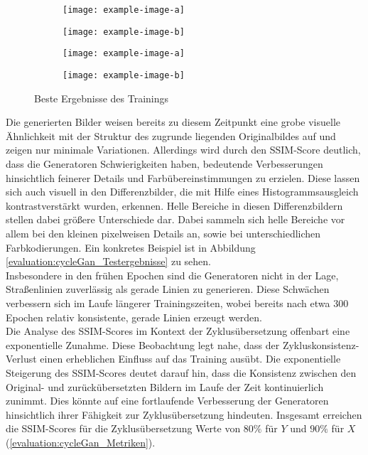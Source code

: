 \begin{figure}
  \medskip

  \begin{subfigure}[t]{.2\textwidth}
    \centering
    \texttt{[image: example-image-a]}
  \end{subfigure}
  \begin{subfigure}[t]{.2\textwidth}
    \centering
    \texttt{[image: example-image-b]}
  \end{subfigure}
  \hfill
  \begin{subfigure}[t]{.2\textwidth}
    \centering
    \texttt{[image: example-image-a]}
  \end{subfigure}
  \begin{subfigure}[t]{.2\textwidth}
    \centering
    \texttt{[image: example-image-b]}
  \end{subfigure}
  \caption{Beste Ergebnisse des Trainings}

\end{figure}


Die generierten Bilder weisen bereits zu diesem Zeitpunkt eine grobe visuelle Ähnlichkeit mit der Struktur des zugrunde liegenden Originalbildes auf und zeigen nur minimale Variationen. Allerdings wird durch den SSIM-Score deutlich, dass die Generatoren Schwierigkeiten haben, bedeutende Verbesserungen hinsichtlich feinerer Details und Farbübereinstimmungen zu erzielen. Diese lassen sich auch visuell in den Differenzbilder, die mit Hilfe eines Histogrammsausgleich kontrastverstärkt wurden, erkennen. Helle Bereiche in diesen Differenzbildern stellen dabei größere Unterschiede dar. Dabei sammeln sich helle Bereiche vor allem bei den kleinen pixelweisen Details an, sowie bei unterschiedlichen Farbkodierungen. Ein konkretes Beispiel ist in Abbildung \ref{evaluation:cycleGan_Testergebnisse} zu sehen.
\\
Insbesondere in den frühen Epochen sind die Generatoren nicht in der Lage, Straßenlinien zuverlässig als gerade Linien zu generieren. Diese Schwächen verbessern sich im Laufe längerer Trainingszeiten, wobei bereits nach etwa 300 Epochen relativ konsistente, gerade Linien erzeugt werden.
\\\newline
Die Analyse des SSIM-Scores im Kontext der Zyklusübersetzung offenbart eine exponentielle Zunahme. Diese Beobachtung legt nahe, dass der Zykluskonsistenz-Verlust einen erheblichen Einfluss auf das Training ausübt. Die exponentielle Steigerung des SSIM-Scores deutet darauf hin, dass die Konsistenz zwischen den Original- und zurückübersetzten Bildern im Laufe der Zeit kontinuierlich zunimmt. Dies könnte auf eine fortlaufende Verbesserung der Generatoren hinsichtlich ihrer Fähigkeit zur Zyklusübersetzung hindeuten. Insgesamt erreichen die SSIM-Scores für die Zyklusübersetzung Werte von $80\%$ für $Y$ und $90\%$ für $X$ (\ref{evaluation:cycleGan_Metriken}).

